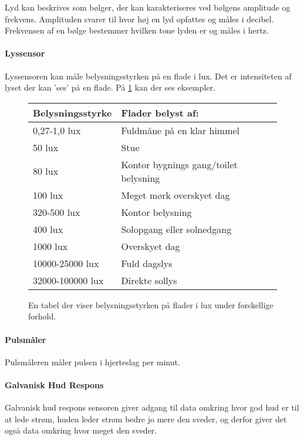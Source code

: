 Lyd kan beskrives som bølger, der kan karakteriseres ved bølgens amplitude og frekvens.
Amplituden svarer til hvor høj en lyd opfattes og måles i decibel.
Frekvensen af en bølge bestemmer hvilken tone lyden er og måles i hertz. \cite{sound}


\paragraph{Lyssensor}
Lyssensoren kan måle belysningsstyrken på en flade i lux. Det er intensiteten af lyset der kan 'ses' på en flade. På \cref{fig:lux}  kan der ses eksempler.

\begin{figure}
	\centering
\begin{tabular}{ l | l}
	\textbf{Belysningsstyrke} & \textbf{Flader belyst af: }\\
\hline
0,27-1,0 lux &  Fuldmåne på en klar himmel \\
\hline
50 lux & Stue \\
\hline
80 lux & Kontor bygnings gang/toilet belysning \\
\hline
100 lux & Meget mørk overskyet dag \\
\hline
320-500 lux & Kontor belysning \\
\hline
400 lux & Solopgang eller solnedgang \\
\hline
1000 lux & Overskyet dag \\
\hline
10000-25000 lux & Fuld dagslys \\
\hline
32000-100000 lux & Direkte sollys\\
\hline
\end{tabular}
\caption{En tabel der viser belysningsstyrken på flader i lux under forskellige forhold. \citep{misc:lux}}
\label{fig:lux}
\end{figure}

\paragraph{Pulsmåler}
Pulsmåleren måler pulsen i hjerteslag per minut.

\paragraph{Galvanisk Hud Respons}
Galvanisk hud respons sensoren giver adgang til data omkring hvor god hud er til at lede strøm, huden leder strøm bedre jo mere den sveder, og derfor giver det også data omkring hvor meget den sveder.